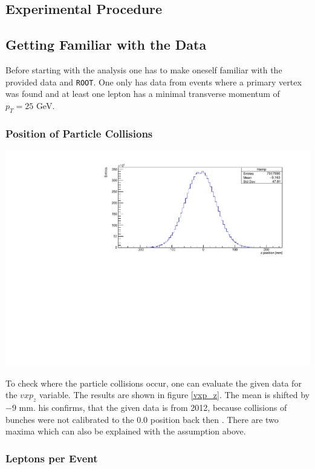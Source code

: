 \documentclass[12pt, a4paper, bibliography=totoc]{scrartcl}
\begin{document}
\begin{multicols}{2}
\section{Experimental Procedure}

\subsection{Getting Familiar with the Data}
Before starting with the analysis one has to make oneself familiar with the provided data and \verb*+ROOT+.
One only has data from events where a primary vertex was found and at least one lepton has a minimal transverse momentum of $p_{T} = 25$ \si{GeV}.

\subsubsection{Position of Particle Collisions}
\begin{center}
	\includegraphics[width=\linewidth]{fig/vxp_z_final.pdf}
	\label{vxp_z}
\end{center}
To check where the particle collisions occur, one can evaluate the given data for the $vxp_z$ variable. 
The results are shown in figure \ref{vxp_z}.
The mean is shifted by $-9$ \si{mm}. 
his confirms, that the given data is from 2012, because collisions of bunches were not calibrated to the $0.0$ position back then \cite{atlasbeamspot}.
There are two maxima which can also be explained with the assumption above. 

\subsubsection{Leptons per Event}


\end{multicols}
\end{document}

